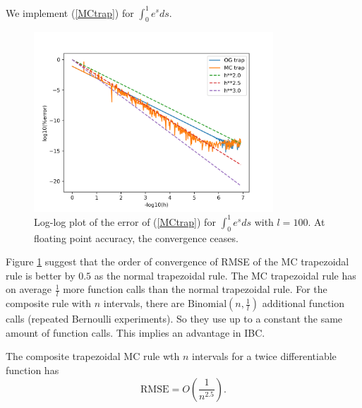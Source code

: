 \documentclass[a4paper,12pt]{article}
\begin{document}
\begin{pythonn}
    We implement (\ref{MCtrap}) for $\int_{0}^{1}e^{s}ds$.
    \vspace*{0.5cm}

    \begin{figure}[h!]
        \centering
        \includegraphics[width=0.8\textwidth]{plots/MCtrap.png}
        \caption{Log-log plot of the error of (\ref{MCtrap}) for
        $\int_{0}^{1}e^{s}ds$ with $l=100$. At floating point accuracy,
        the convergence ceases.
        }
        \label{fig:MCtrap}
    \end{figure}
\end{pythonn}

Figure \ref{fig:MCtrap} suggest that the order of convergence of RMSE of the
MC trapezoidal rule is better by $0.5$ as the normal trapezoidal rule.
The MC trapezoidal rule has on average $\frac{1}{l}$ more function calls than
the normal trapezoidal rule. For the composite rule with $n$ intervals,
there are $\text{Binomial}(n,\frac{1}{l})$ additional function calls
(repeated Bernoulli experiments). So they use up to a constant the same amount
of function calls. This implies an advantage in IBC. \\

\begin{theorem} \label{thrm:order trap}
    The composite trapezoidal MC rule  wth $n$ intervals
    for a twice differentiable function has
    \begin{equation}
        \text{RMSE} =O\left(\frac{1}{n^{2.5}} \right) .
    \end{equation}

\end{theorem}
\end{document}
